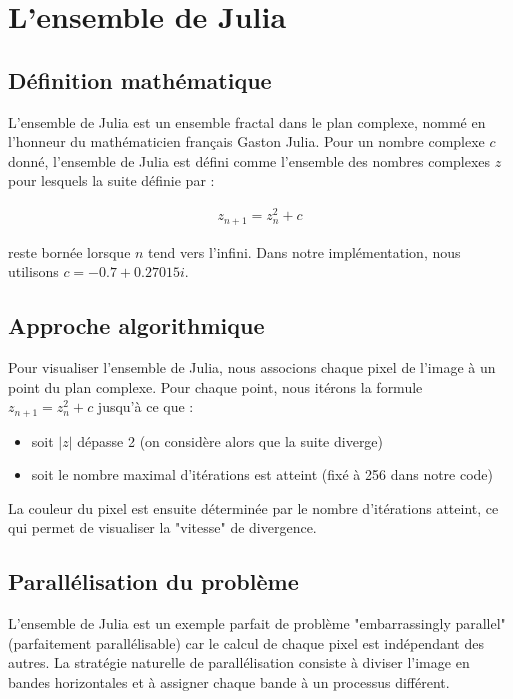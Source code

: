 \documentclass[a4paper,11pt]{article}
\begin{document}
\section{L'ensemble de Julia}

\subsection{Définition mathématique}

L'ensemble de Julia est un ensemble fractal dans le plan complexe, nommé en l'honneur du mathématicien français Gaston Julia. Pour un nombre complexe $c$ donné, l'ensemble de Julia est défini comme l'ensemble des nombres complexes $z$ pour lesquels la suite définie par :

\begin{align}
z_{n+1} = z_n^2 + c
\end{align}

reste bornée lorsque $n$ tend vers l'infini. Dans notre implémentation, nous utilisons $c = -0.7 + 0.27015i$.

\subsection{Approche algorithmique}

Pour visualiser l'ensemble de Julia, nous associons chaque pixel de l'image à un point du plan complexe. Pour chaque point, nous itérons la formule $z_{n+1} = z_n^2 + c$ jusqu'à ce que :
\begin{itemize}
  \item soit $|z|$ dépasse 2 (on considère alors que la suite diverge)
  \item soit le nombre maximal d'itérations est atteint (fixé à 256 dans notre code)
\end{itemize}

La couleur du pixel est ensuite déterminée par le nombre d'itérations atteint, ce qui permet de visualiser la "vitesse" de divergence.

\subsection{Parallélisation du problème}

L'ensemble de Julia est un exemple parfait de problème "embarrassingly parallel" (parfaitement parallélisable) car le calcul de chaque pixel est indépendant des autres. La stratégie naturelle de parallélisation consiste à diviser l'image en bandes horizontales et à assigner chaque bande à un processus différent.
\end{document}
